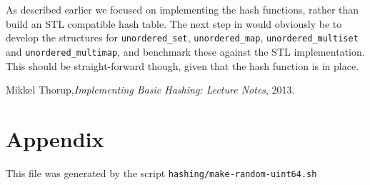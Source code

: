 \documentclass[]{article}
\newcommand{\funk}[1]{\texttt{\small #1}}
\newcommand{\includecode}[2][C]{}
\begin{document}
As described earlier we focused on implementing the hash functions, rather than build an STL compatible hash table. The next step in would obviously be to develop the structures for \funk{unordered\_set}, \funk{unordered\_map}, \funk{unordered\_multiset} and \funk{unordered\_multimap}, and benchmark these against the STL implementation. This should be straight-forward though, given that the hash function is in place.



\begin{thebibliography}{2}
Mikkel Thorup,\emph{Implementing Basic Hashing: Lecture Notes}, 2013.
\end{thebibliography}

\section*{Appendix}

\lstlistoflistings
\newpage
\includecode{hashing/hotbox.cpp}
\includecode{hashing/std.ipp}
\newpage
\includecode{hashing/dshash.ipp}
\newpage

\newpage
This file was generated by the script \funk{hashing/make-random-uint64.sh}
\includecode{hashing/random-numbers-uint64.hpp}
\end{document}
